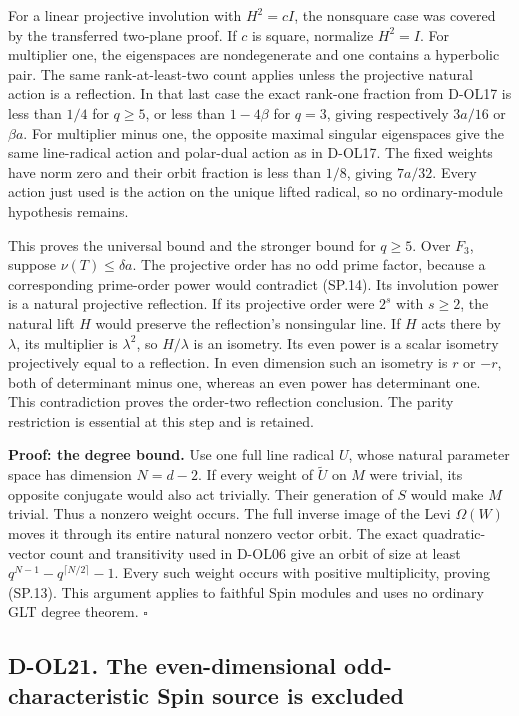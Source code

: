 For a linear projective involution with \(H^2=cI\), the nonsquare case was covered by the transferred two-plane proof. If \(c\) is square, normalize \(H^2=I\). For multiplier one, the eigenspaces are nondegenerate and one contains a hyperbolic pair. The same rank-at-least-two count applies unless the projective natural action is a reflection. In that last case the exact rank-one fraction from D-OL17 is less than \(1/4\) for \(q\ge5\), or less than \(1-4\beta\) for \(q=3\), giving respectively \(3a/16\) or \(\beta a\). For multiplier minus one, the opposite maximal singular eigenspaces give the same line-radical action and polar-dual action as in D-OL17. The fixed weights have norm zero and their orbit fraction is less than \(1/8\), giving \(7a/32\). Every action just used is the action on the unique lifted radical, so no ordinary-module hypothesis remains.

This proves the universal bound and the stronger bound for \(q\ge5\). Over \(F_3\), suppose \(\nu(T)\le\delta a\). The projective order has no odd prime factor, because a corresponding prime-order power would contradict (SP.14). Its involution power is a natural projective reflection. If its projective order were \(2^s\) with \(s\ge2\), the natural lift \(H\) would preserve the reflection's nonsingular line. If \(H\) acts there by \(\lambda\), its multiplier is \(\lambda^2\), so \(H/\lambda\) is an isometry. Its even power is a scalar isometry projectively equal to a reflection. In even dimension such an isometry is \(r\) or \(-r\), both of determinant minus one, whereas an even power has determinant one. This contradiction proves the order-two reflection conclusion. The parity restriction is essential at this step and is retained.

\textbf{Proof: the degree bound.} Use one full line radical \(U\), whose natural parameter space has dimension \(N=d-2\). If every weight of \(\widetilde U\) on \(M\) were trivial, its opposite conjugate would also act trivially. Their generation of \(S\) would make \(M\) trivial. Thus a nonzero weight occurs. The full inverse image of the Levi \(\Omega(W)\) moves it through its entire natural nonzero vector orbit. The exact quadratic-vector count and transitivity used in D-OL06 give an orbit of size at least \(q^{N-1}-q^{\lceil N/2\rceil}-1\). Every such weight occurs with positive multiplicity, proving (SP.13). This argument applies to faithful Spin modules and uses no ordinary GLT degree theorem. \(\square\)

\subsection{D-OL21. The even-dimensional odd-characteristic Spin source is excluded}\label{SF-SPIN:d-ol21.-the-even-dimensional-odd-characteristic-spin-source-is-excluded}

